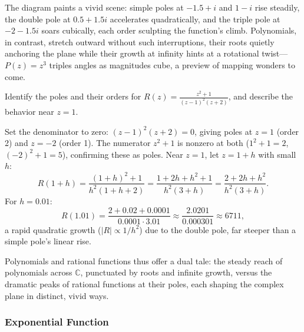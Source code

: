 \noindent The diagram paints a vivid scene: simple poles at $-1.5 + i$ and $1 - i$ rise steadily, the double pole at $0.5 + 1.5i$ accelerates quadratically, and the triple pole at $-2 - 1.5i$ soars cubically, each order sculpting the function’s climb. Polynomials, in contrast, stretch outward without such interruptions, their roots quietly anchoring the plane while their growth at infinity hints at a rotational twist—$P(z) = z^3$ triples angles as magnitudes cube, a preview of mapping wonders to come.

\exampleline
\begin{example}
Identify the poles and their orders for $R(z) = \frac{z^2 + 1}{(z - 1)^2 (z + 2)}$, and describe the behavior near $z = 1$.

\begin{solution}
Set the denominator to zero: $(z - 1)^2 (z + 2) = 0$, giving poles at $z = 1$ (order 2) and $z = -2$ (order 1). The numerator $z^2 + 1$ is nonzero at both ($1^2 + 1 = 2$, $(-2)^2 + 1 = 5$), confirming these as poles. Near $z = 1$, let $z = 1 + h$ with small $h$:
\[
R(1 + h) = \frac{(1 + h)^2 + 1}{h^2 (1 + h + 2)} = \frac{1 + 2h + h^2 + 1}{h^2 (3 + h)} = \frac{2 + 2h + h^2}{h^2 (3 + h)}.
\]
For $h = 0.01$:
\[
R(1.01) = \frac{2 + 0.02 + 0.0001}{0.0001 \cdot 3.01} \approx \frac{2.0201}{0.000301} \approx 6711,
\]
a rapid quadratic growth ($|R| \propto 1/h^2$) due to the double pole, far steeper than a simple pole’s linear rise.
\end{solution}
\end{example}
\exampleline

\noindent Polynomials and rational functions thus offer a dual tale: the steady reach of polynomials across $\mathbb{C}$, punctuated by roots and infinite growth, versus the dramatic peaks of rational functions at their poles, each shaping the complex plane in distinct, vivid ways.

\subsubsection*{Exponential Function} 

